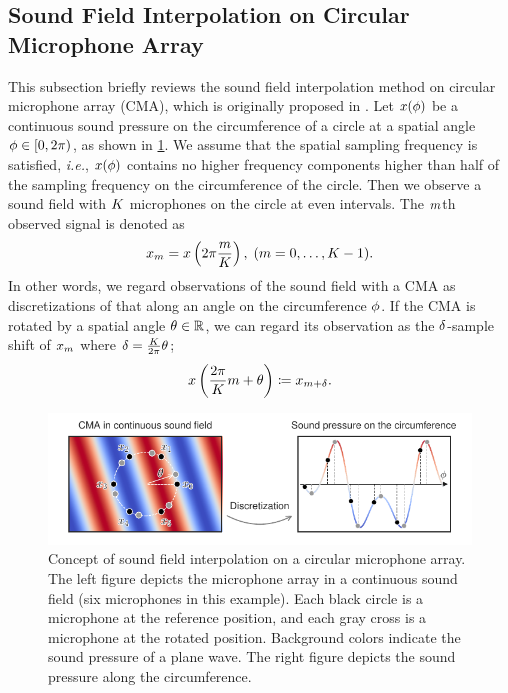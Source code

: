 \documentclass[sip,biber]{now-journal}
\begin{document}
\subsection{Sound Field Interpolation on Circular Microphone Array}
This subsection briefly reviews the sound field interpolation method on circular microphone array (CMA), which is originally proposed in \cite{Wakabayashi:2021:ICASSP,Wakabayashi:2023:ASLP}.
Let $x (\phi)$ be a continuous sound pressure on the circumference of a circle at a spatial angle $\rotCoor \in \interval[open right,soft open fences]{0}{2\pi}$, as shown in \cref{fig:sfi}.
We assume that the spatial sampling frequency is satisfied, \emph{i.e.}, $x (\phi)$ contains no higher frequency components higher than half of the sampling frequency on the circumference of the circle.
Then we observe a sound field with $K$ microphones on the circle at even intervals.
The $m$th observed signal is denoted as
\begin{equation}
  \sfcma _{\mic} = \sfcma \left(2\pi \frac{\mic}{\Mic}\right),\; (\mic = 0, \dots, \Mic - 1).%
  \label{eq:sfi:model}
\end{equation}
In other words, we regard observations of the sound field with a CMA as discretizations of that along an angle on the circumference $\phi$.
If the CMA is rotated by a spatial angle $\theta \in \mathbb{R}$, we can regard its observation as the $\delta$-sample shift of $x _{m}$ where $\delta = \frac{K}{2\pi} \theta$;
\begin{equation}
  \sfcma \left(\frac{2\pi}{\Mic} \mic + \rotSpat \right)%
  \coloneqq
  \sfcma _{\mic + \rotSmpl}.
  \label{eq:sfi:shift:obs}
\end{equation}
\begin{figure}[t]
  \centering
  \includegraphics{figures/diagrams/sfi.pdf}
  \caption{%
    Concept of sound field interpolation on a circular microphone array.
    The left figure depicts the microphone array in a continuous sound field (six microphones in this example).
    Each black circle is a microphone at the reference position, and each gray cross is a microphone at the rotated position.
    Background colors indicate the sound pressure of a plane wave.
    The right figure depicts the sound pressure along the circumference.
  }%
  \label{fig:sfi}
\end{figure}
\end{document}
